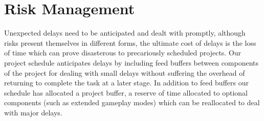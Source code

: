 \section{Risk Management}
Unexpected delays need to be anticipated and dealt with promptly, although risks present themselves in different forms, the ultimate cost of delays is the loss of time which can prove disasterous to precariously scheduled projects. Our project schedule anticipates delays by including feed buffers between components of the project for dealing with small delays without suffering the overhead of returning to complete the task at a later stage. In addition to feed buffers our schedule has allocated a project buffer, a reserve of time allocated to optional components (such as extended gameplay modes) which can be reallocated to deal with major delays.
